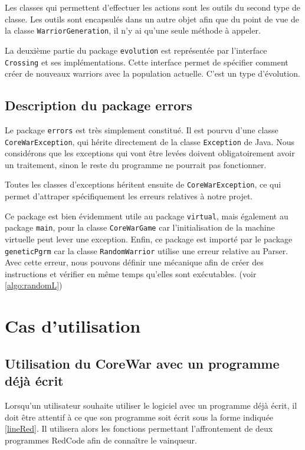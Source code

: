 \documentclass[hidelinks]{report}
\begin{document}
Les classes qui permettent d'effectuer les actions sont les outils du second type de classe. Les outils sont encapsulés dans un autre objet afin que du point de vue de la classe \texttt{WarriorGeneration}, il n'y ai qu'une seule méthode à appeler.

La deuxième partie du package \texttt{evolution} est représentée par l'interface \texttt{Crossing} et ses implémentations. Cette interface permet de spécifier comment créer de nouveaux warriors avec la population actuelle. C'est un type d'évolution.
\subsection{Description du package errors}
Le package \texttt{errors} est très simplement constitué. Il est pourvu d'une classe \texttt{CoreWarException}, qui hérite directement de la classe \texttt{Exception} de Java. Nous considérons que les exceptions qui vont être levées doivent obligatoirement avoir un traitement, sinon le reste du programme ne pourrait pas fonctionner. 

Toutes les classes d'exceptions héritent ensuite de \texttt{CoreWarException}, ce qui permet d'attraper spécifiquement les erreurs relatives à notre projet.

Ce package est bien évidemment utile au package \texttt{virtual}, mais également au package \texttt{main}, pour la classe \texttt{CoreWarGame} car l'initialisation de la machine virtuelle peut lever une exception. Enfin, ce package est importé par le package \texttt{geneticPgrm} car la classe \texttt{RandomWarrior} utilise une erreur relative au Parser. Avec cette erreur, nous pouvons définir une mécanique afin de créer des instructions et vérifier en même temps qu'elles sont exécutables. (voir \autoref{algo:randomL})

\section{Cas d'utilisation}
\subsection{Utilisation du CoreWar avec un programme déjà écrit}
Lorsqu'un utilisateur souhaite utiliser le logiciel avec un programme déjà écrit, il doit être attentif à ce que son programme soit écrit sous la forme indiquée \autoref{lineRed}. Il utilisera alors les fonctions permettant l'affrontement de deux programmes RedCode afin de connaître le vainqueur.
\end{document}
